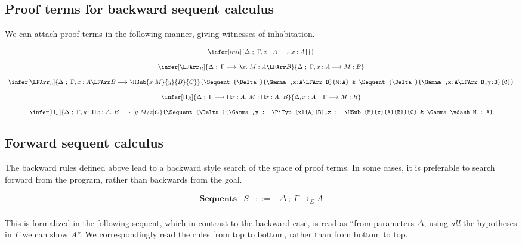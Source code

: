 \subsection{Proof terms for backward sequent calculus}

  We can attach proof terms in the following manner, giving
witnesses of inhabitation.

$$
\begin{array}{c}
\infer[init]{\Sequent{\Delta}{\Gamma,x:A}{x:A}}{} \\\\
\infer[\LFArr_R]{\Sequent{\Delta}{\Gamma}{\Lam{x}{M} : A\LFArr B}}
                {\Sequent{\Delta}{\Gamma,x:A}{M:B}} \\\\
\infer[\LFArr_L]{\Sequent{\Delta}{\Gamma,x:A\LFArr B}{\HSub{x\ M}{y}{B}{C}}}
                {\Sequent{\Delta}{\Gamma,x:A\LFArr B}{M:A} & 
                 \Sequent{\Delta}{\Gamma,x:A\LFArr B,y:B}{C}}\\\\
\infer[\Pi_R]{\Sequent{\Delta}{\Gamma}{\PiTyp{x}{A}{M}:\PiTyp{x}{A}{B}}}
             {\Sequent{\Delta,x:A}{\Gamma}{M:B}} \\\\
\infer[\Pi_L]{\Sequent{\Delta}{\Gamma,y : \PiTyp{x}{A}{B}}{[y\ M/z] C}}
             {\Sequent{\Delta}{\Gamma,y : \PiTyp{x}{A}{B},z : \HSub{M}{x}{A}{B}}{C} &
              \Gamma \vdash M : A}
\end{array} 
$$

\subsection{Forward sequent calculus}

The backward rules defined above lead to a backward style search
of the space of proof terms.  
 In some cases, it is preferable to
search forward from the program, rather than backwards from the
goal. 

\renewcommand{\Sequent}[4][]{#2\ ;\ #3 \longrightarrow_{#1} #4}

$$
\begin{array}{llll}
\mathbf{Sequents} & S & ::= & \Sequent[\Sigma]{\Delta}{\Gamma}{A} \\
\end{array} 
$$

 This is formalized in the following sequent, which in contrast
to the backward case, is read as ``from parameters $\Delta$,
using \emph{all} the hypotheses in $\Gamma$ we can show $A$''.
We correspondingly read the rules from top to bottom, rather
than from bottom to top.

